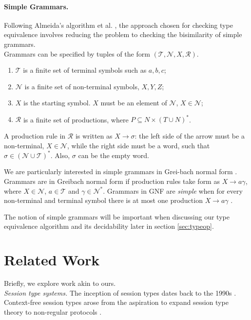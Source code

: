 \documentclass[sigplan]{acmart}
\begin{document}
\paragraph{Simple Grammars.}
Following Almeida's algorithm et al. \cite{AlmeidaMV20}, the approach chosen for checking type equivalence involves reducing the problem to checking the bisimilarity of simple grammars.\\
Grammars can be specified by tuples of the form $(\mathcal{T, N}, X, \mathcal{R})$. 
\begin{enumerate}
    \item $\mathcal{T}$ is a finite set of terminal symbols such as $a, b, c$; 
    \item $\mathcal{N}$ is a finite set of non-terminal symbols, $X, Y, Z$;
    \item $X$ is the starting symbol. $X$ must be an element of $\mathcal{N}$, $X\in\mathcal{N}$;
    \item $\mathcal{R}$ is a finite set of productions, where $P \subseteq N \times (T \cup N)^*$. 
\end{enumerate}
A production rule in $\mathcal{R}$ is written as $X \rightarrow \sigma$: the left side of the arrow must be a non-terminal, $X\in\mathcal{N}$, while the right side must be a word, such that $\sigma\in(\mathcal{N}\cup\mathcal{T})^*$. Also, $\sigma$ can be the empty word.

We are particularly interested in simple grammars in Grei-bach normal form \cite{AutebertG84}. Grammars are in Greibach normal form if production rules take form as $X \rightarrow a\gamma$, where $X\in\mathcal{N}$, $a\in\mathcal{T}$ and $\gamma\in\mathcal{N}^*$. Grammars in GNF are \emph{simple} when for every non-terminal and terminal symbol there is at most one production $X \rightarrow a\gamma$ \cite{KorenjakH66}.

The notion of simple grammars will be important when discussing our type equivalence algorithm and its decidability later in section \ref{sec:typeop}.

\section{Related Work} \label{sec:relatedwork}
Briefly, we explore work akin to ours.\\

\textit{Session type systems.   }
The inception of session types dates back to the 1990s \cite{Honda93, HondaVK98, TakeuchiHK94}. Context-free session types arose from the aspiration to expand session type theory to non-regular protocols \cite{Puntigam99,RavaraV97}.
\end{document}
